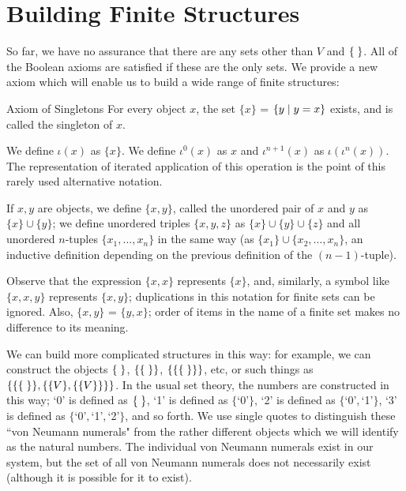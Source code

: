 \chapter[Building Finite Structures]{Building Finite
Structures}


So far, we have no assurance that there are any sets other
than $V$ and $\mbox{$\{\;\}$}$.  All of the Boolean
axioms are satisfied if these are the only sets.  We provide a new axiom which
will enable us to build a wide range of finite structures:

\begin{axiom}{Axiom of
Singletons}
  For every object $x$, the set $\{x\}$ = $\{y \mid y = x\}$
  exists, and is called the {\upshape singleton} of $x$.
\end{axiom}

\begin{definition}
We define $\iota(x)$ as $\{x\}$.  We define $\iota^0(x)$ as $x$ and $\iota^{n+1}(x)$ as $\iota(\iota^n(x))$.  The representation of iterated application of this operation is the point of this rarely used alternative notation.
\end{definition}

\begin{definition}
 If $x,y$ are objects, we define $\{x,y\}$, called the {\upshape unordered
 pair} of $x$ and $y$ as $\{x\} \cup \{y\}$;
 we define unordered triples $\{x,y,z\}$ as
 $\{x\} \cup \{y\} \cup \{z\}$ and all unordered $n$-tuples
 $\{x_1,...,x_n\}$ in the same
 way (as $\{x_1\} \cup \{x_2,\ldots,x_n\}$, an inductive definition depending
 on the previous definition of the $(n-1)$-tuple).
\end{definition}

Observe that the expression $\{x,x\}$ represents $\{x\}$, and,
similarly, a symbol like $\{x,x,y\}$ represents $\{x,y\}$; duplications in
this notation for finite sets can be ignored.
Also, $\{x,y\}$ = $\{y,x\}$;
order of items in the name of a finite set makes no difference to its
meaning.

We can build more complicated structures in this way: for
example, we can construct the objects $\mbox{$\{\;\}$}$, $\{\mbox{$\{\;\}$}\}$, $\{\{\mbox{$\{\;\}$}\}\}$,
etc, or such 
things as $\{\{\mbox{$\{\;\}$}\},\{\{V\},\{\{V\}\}\}\}$.  In the
usual set theory, the numbers 
are constructed in this way; `0' is defined as $\mbox{$\{\;\}$}$, `1' is defined as
$\{$`0'$\}$, `2' is defined as $\{$`0'$,$`1'$\}$, `3' is defined as
$\{$`0'$,$`1'$,$`2'$\}$,
and so forth.  We use single quotes to distinguish these ``von Neumann
numerals" from the rather different objects which we
will identify as 
the natural numbers.  The individual von Neumann numerals
exist in our system, but the set of all von Neumann numerals does not
necessarily exist (although it is possible for it to exist).  
        
